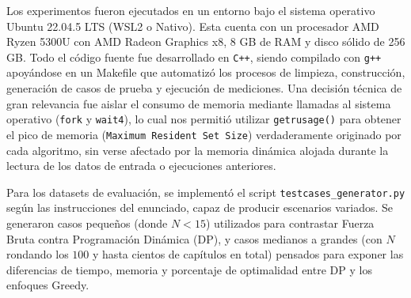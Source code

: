 Los experimentos fueron ejecutados en un entorno bajo el sistema operativo Ubuntu 22.04.5 LTS (WSL2 o Nativo).
Esta cuenta con un procesador AMD Ryzen 5300U con AMD Radeon Graphics x8, 8 GB de RAM y disco sólido de 256 GB.
Todo el código fuente fue desarrollado en \texttt{C++}, siendo compilado con \texttt{g++} apoyándose en un
Makefile que automatizó los procesos de limpieza, construcción, generación de casos de prueba y ejecución
de mediciones. Una decisión técnica de gran relevancia fue aislar el consumo de memoria mediante llamadas
al sistema operativo (\texttt{fork} y \texttt{wait4}), lo cual nos permitió utilizar \texttt{getrusage()}
para obtener el pico de memoria (\texttt{Maximum Resident Set Size}) verdaderamente originado por cada algoritmo,
 sin verse afectado por la memoria dinámica alojada durante la lectura de los datos de entrada o ejecuciones anteriores.

Para los datasets de evaluación, se implementó el script \texttt{testcases\_generator.py} según las instrucciones del
enunciado, capaz de producir escenarios variados. Se generaron casos pequeños (donde $N < 15$) utilizados para contrastar
Fuerza Bruta contra Programación Dinámica (DP), y casos medianos a grandes (con $N$ rondando los $100$ y hasta cientos de
capítulos en total) pensados para exponer las diferencias de tiempo, memoria y porcentaje de optimalidad entre DP y los
enfoques Greedy.
